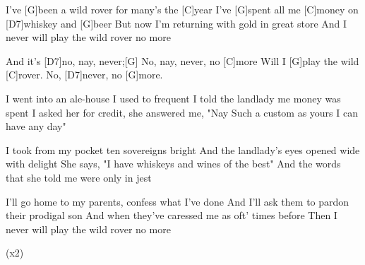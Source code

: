 



\begin{guitar}
	I've [G]been a wild rover for many's the [C]year
	I've [G]spent all me [C]money on [D7]whiskey and [G]beer
	But now I'm returning with gold in great store
	And I never will play the wild rover no more
	
	And it's [D7]no, nay, never;[G] No, nay, never, no [C]more
	Will I [G]play the wild [C]rover. No, [D7]never, no [G]more.
	
	I went into an ale-house I used to frequent
	I told the landlady me money was spent
	I asked her for credit, she answered me, "Nay
	Such a custom as yours I can have any day"
	
	 
	
	I took from my pocket ten sovereigns bright
	And the landlady's eyes opened wide with delight
	She says, "I have whiskeys and wines of the best"
	And the words that she told me were only in jest
	
	 
	
	I'll go home to my parents, confess what I've done
	And I'll ask them to pardon their prodigal son
	And when they've caressed me as oft' times before
	Then I never will play the wild rover no more
	
	  (x2)
\end{guitar}